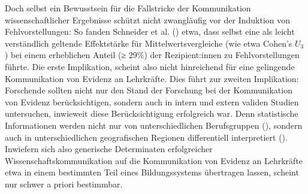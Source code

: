\documentclass[
  man,
  floatsintext,
  longtable,
  nolmodern,
  notxfonts,
  notimes,
  colorlinks=true,linkcolor=blue,citecolor=blue,urlcolor=blue]{apa7}
\begin{document}
Doch selbst ein Bewusstsein für die Fallstricke der Kommunikation
wissenschaftlicher Ergebnisse schützt nicht zwangläufig vor der
Induktion von Fehlvorstellungen: So fanden Schneider et al.
() etwa, dass selbst eine als leicht
verständlich geltende Effektstärke für Mittelwertsvergleiche (wie etwa
Cohen's \(U_3\)) bei einem erheblichen Anteil (≥ 29\%) der
Rezipient:innen zu Fehlvorstellungen führte. Die erste Implikation,
scheint also nicht hinreichend für eine gelingende Kommunikation von
Evidenz an Lehrkräfte. Dies führt zur zweiten Implikation: Forschende
sollten nicht nur den Stand der Forschung bei der Kommunikation von
Evidenz berücksichtigen, sondern auch in intern und extern validen
Studien untersuchen, inwieweit diese Berücksichtigung erfolgreich war.
Denn statistische Informationen werden nicht nur von unterschiedlichen
Berufsgruppen (),
sondern auch in unterschiedlichen geografischen Regionen differentiell
interpretiert ().
Inwiefern sich also generische Determinaten erfolgreicher
Wissenschaftskommunikation auf die Kommunikation von Evidenz an
Lehrkräfte etwa in einem bestimmten Teil eines Bildungssystems
übertragen lassen, scheint nur schwer a priori bestimmbar.
\end{document}
